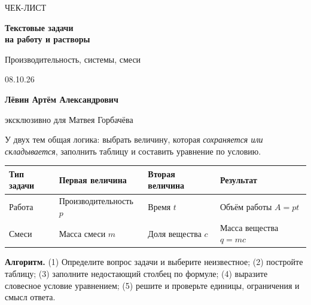 \documentclass[a4paper,12pt]{article}
\newcommand{\sectiontitle}[1]{%
  \vspace{2mm}{\Large\bfseries\color{darkaccent}#1}\par
  \vspace{1.2mm}{\color{rulegray}\hrule}\vspace{3mm}}
\newcommand{\key}[1]{\textbf{\color{darkaccent}#1}}
\begin{document}
\thispagestyle{empty}
\begin{center}
\vspace*{31mm}
{\small\color{softgray}ЧЕК-ЛИСТ}\par\vspace{7mm}
{\Huge\bfseries\color{darkaccent}Текстовые задачи\\[2mm]на работу и растворы}\par
\vspace{7mm}
{\Large Производительность, системы, смеси}\par
\vspace{18mm}
{\large 08.10.26}\par
\vfill
{\large\bfseries Лёвин Артём Александрович}\par\vspace{2mm}
{\large эксклюзивно для Матвея Горбачёва}\par
\vspace{20mm}
\end{center}
\clearpage

\sectiontitle{1. Единый табличный метод}

У двух тем общая логика: выбрать величину, которая \emph{сохраняется или складывается}, заполнить таблицу и составить уравнение по условию.

\begin{center}
\begin{tabularx}{\linewidth}{@{}p{36mm}XXX@{}}
\toprule
Тип задачи & Первая величина & Вторая величина & Результат \\
\midrule
Работа & Производительность $p$ & Время $t$ & Объём работы $A=pt$ \\
Смеси & Масса смеси $m$ & Доля вещества $c$ & Масса вещества $q=mc$ \\
\bottomrule
\end{tabularx}
\end{center}

\key{Алгоритм.} (1) Определите вопрос задачи и выберите неизвестное; (2) постройте таблицу; (3) заполните недостающий столбец по формуле; (4) выразите словесное условие уравнением; (5) решите и проверьте единицы, ограничения и смысл ответа.
\end{document}
